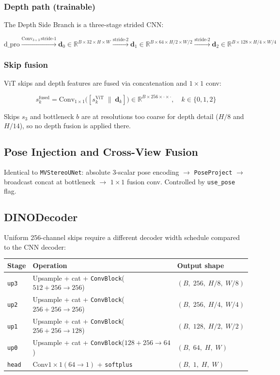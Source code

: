 \documentclass[11pt]{article}
\begin{document}
\subsubsection{Depth path (trainable)}

The Depth Side Branch is a three-stage strided CNN:

\[
\text{d\_pro} \xrightarrow{\text{Conv}_{3\times3}\,\text{stride-1}} \mathbf{d}_0 \in \mathbb{R}^{B\times32\times H\times W}
\xrightarrow{\text{stride-2}} \mathbf{d}_1 \in \mathbb{R}^{B\times64\times H/2\times W/2}
\xrightarrow{\text{stride-2}} \mathbf{d}_2 \in \mathbb{R}^{B\times128\times H/4\times W/4}
\]

\subsubsection{Skip fusion}

ViT skips and depth features are fused via concatenation and $1\times1$ conv:

\[
s_k^{\text{fused}} = \text{Conv}_{1\times1}\!\bigl([s_k^{\text{ViT}} \;\|\; \mathbf{d}_k]\bigr)
\in \mathbb{R}^{B \times 256 \times \cdot \times \cdot}, \quad k \in \{0,1,2\}
\]

Skips $s_3$ and bottleneck $b$ are at resolutions too coarse for depth detail
($H/8$ and $H/14$), so no depth fusion is applied there.

\subsection{Pose Injection and Cross-View Fusion}

Identical to \texttt{MVStereoUNet}: absolute 3-scalar pose encoding $\to$
\texttt{PoseProject} $\to$ broadcast concat at bottleneck $\to$
$1\times1$ fusion conv.  Controlled by \texttt{use\_pose} flag.

\subsection{DINODecoder}

Uniform 256-channel skips require a different decoder width schedule compared
to the CNN decoder:

\begin{center}
\begin{tabular}{lll}
\toprule
\textbf{Stage} & \textbf{Operation} & \textbf{Output shape} \\
\midrule
\texttt{up3} & Upsample + cat + \texttt{ConvBlock}($512 + 256 \to 256$) & $(B,\;256,\;H/8,\;W/8)$ \\
\texttt{up2} & Upsample + cat + \texttt{ConvBlock}($256 + 256 \to 256$) & $(B,\;256,\;H/4,\;W/4)$ \\
\texttt{up1} & Upsample + cat + \texttt{ConvBlock}($256 + 256 \to 128$) & $(B,\;128,\;H/2,\;W/2)$ \\
\texttt{up0} & Upsample + cat + \texttt{ConvBlock}($128 + 256 \to 64$)  & $(B,\;64,\;H,\;W)$ \\
\texttt{head}& Conv$1\times1(64 \to 1)$ + \texttt{softplus}             & $(B,\;1,\;H,\;W)$ \\
\bottomrule
\end{tabular}
\end{center}
\end{document}
